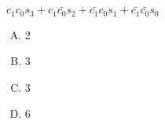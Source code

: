 {{        %
        \begin{practices}

        \end{practices}

        \begin{practices}

        \end{practices}

        \begin{practices}

        \end{practices}

        \begin{practices}

        \end{practices}

        \begin{practices}
            $c_1c_0s_3 + c_1\bar{c_0}s_2 + \bar{c_1}c_0s_1 + \bar{c_1}\bar{c_0}s_0$
        \end{practices}

        \begin{practices}
            \begin{enumerate}[A.]
                \item 2
                \item 3
                \item 3
                \item 6
            \end{enumerate}
        \end{practices}
    }
}

